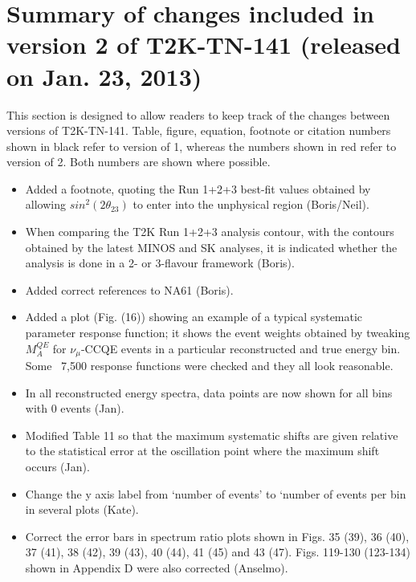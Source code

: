 \clearpage

\section{Summary of changes included in version 2 of T2K-TN-141 (released on Jan. 23, 2013)}

This section is designed to allow readers to keep track of the changes between versions of T2K-TN-141.
Table, figure, equation, footnote or citation numbers shown in black refer to version of 1,
{\color{red}whereas the numbers shown in red refer to version of 2}.
Both numbers are shown where possible.

\begin{itemize}

\item
Added a footnote, quoting the Run 1+2+3 best-fit values obtained by allowing
$sin^{2}(2\theta_{23})$ to enter into the unphysical region (Boris/Neil). \checkmark

\item
When comparing the T2K Run 1+2+3 analysis contour, with the contours obtained
by the latest MINOS and SK analyses, it is indicated whether the analysis is done 
in a 2- or 3-flavour framework (Boris). \checkmark

\item
Added correct references to NA61 (Boris). \checkmark

\item
Added a plot (Fig. {\color{red}(16)}) 
showing an example of a typical systematic parameter response function; 
it shows the event weights 
obtained by tweaking $M_{A}^{QE}$ for $\nu_{\mu}$-CCQE events in a particular
reconstructed and true energy bin.  
Some ~7,500 response functions were checked and they all look reasonable.
\checkmark

\item
In all reconstructed energy spectra, data points are now shown for all bins with 0 events (Jan). \checkmark

\item
Modified Table 11 so that the maximum systematic shifts are given relative to the
statistical error at the oscillation point where the maximum shift occurs (Jan). \checkmark

\item
Change the y axis label from `number of events' to `number of events per bin in several plots (Kate). \checkmark

\item
Correct the error bars in spectrum ratio plots shown in Figs.
35 {\color{red}(39)},
36 {\color{red}(40)},
37 {\color{red}(41)},
38 {\color{red}(42)},
39 {\color{red}(43)},
40 {\color{red}(44)},
41 {\color{red}(45)} and
43 {\color{red}(47)}.
Figs. 119-130 {\color{red}(123-134)} shown in Appendix D were also corrected (Anselmo). \checkmark


\end{itemize}
